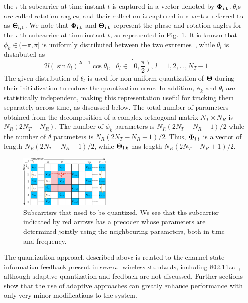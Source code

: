 \documentclass[journal,10pt,twocolumn]{IEEEtran}
\begin{document}
the $i$-th subcarrier at time instant $t$ is captured in a vector
denoted by $\bf{\Phi_{i,t}}$. $\theta_{l}$s are called rotation angles, and
their collection is captured in a vector referred to as
$\bf{\Theta_{i,t}}$. We note that $\bf{\Phi_{i,t}}$ and $\bf{\Theta_{i,t}}$ represent
the phase and rotation angles for the $i$-th subcarrier at time
instant $t$, as represented in Fig.~\ref{fig:adpm-fig}. It is known
that $\phi_k \in (-\pi, \pi]$ is uniformly distributed between the two
extremes~\cite{4114278}, while $\theta_l$ is distributed
as~\cite{4114278}
\begin{equation}
2l(\sin\theta_l)^{2l-1}\cos\theta_l, \mbox{  }\theta_l \in \left[0, \frac{\pi}{2}\right) \mbox{, } l = 1,2,\ldots,N_T -1
\end{equation}
The given distribution of $\theta_l$ is used for non-uniform quantization
of $\bf{\Theta}$ during their initialization to reduce the quantization error.
In addition, $\phi_k$ and $\theta_l$ are statistically independent,
making this representation useful for tracking them separately across
time, as discussed below. The total number of
parameters obtained from the decomposition of a complex orthogonal
matrix $N_{T} \times N_{R} $ is $N_{R}(2N_{T} - N_{R})$. The number of
$\phi_k$ parameters is $N_{R}(2N_{T} - N_{R}-1)/2$ while the number of
$\theta$ parameters is $N_{R}(2N_{T} - N_{R}+1)/2$. Thus, $\bf{\Phi_{i,t}}$
is a vector of length $N_{R}(2N_{T} - N_{R}-1)/2$, while
$\bf{\Theta_{i,t}}$ has length $N_{R}(2N_{T} - N_{R}+1)/2$.~\cite{4114278}
\begin{figure}
\begin{center}
\includegraphics[width=0.4\textwidth]{images/new-adpm.pdf}
\caption{\label{fig:adpm-fig}Subcarriers that need to be
  quantized. We see that the subcarrier indicated by
  red arrows has a precoder whose parameters are determined jointly
  using the neighbouring parameters, both in time and frequency.}
\end{center}
\end{figure}

The quantization approach described above is related to the channel
state information feedback present in several wireless standards,
including 802.11ac~\cite{lou2013comparison}, although adaptive
quantization and feedback are not discussed. Further
sections show that the use of adaptive approaches can greatly enhance
performance with only very minor modifications to the system.
\end{document}
